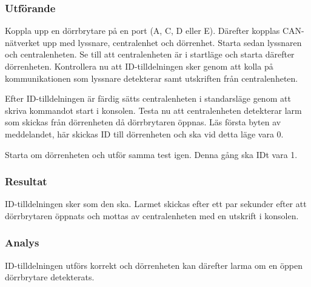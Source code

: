 \subsubsection*{Utförande}
Koppla upp en dörrbrytare på en port (A, C, D eller E). Därefter kopplas CAN-nätverket upp med lyssnare, centralenhet och dörrenhet. Starta sedan lyssnaren och centralenheten. Se till att centralenheten är i startläge och starta därefter dörrenheten. Kontrollera nu att ID-tilldelningen sker genom att kolla på kommunikationen som lyssnare detekterar samt utskriften från centralenheten. 

Efter ID-tilldelningen är färdig sätts centralenheten i standarsläge genom att skriva kommandot start i konsolen. Testa nu att centralenheten detekterar larm som skickas från dörrenheten då dörrbrytaren öppnas. Läs första byten av meddelandet, här skickas ID till dörrenheten och ska vid detta läge vara 0.

Starta om dörrenheten och utför samma test igen. Denna gång ska IDt vara 1.


\subsubsection*{Resultat}
ID-tilldelningen sker som den ska. Larmet skickas efter ett par sekunder efter att dörrbrytaren öppnats och mottas av centralenheten med en utskrift i konsolen.


\subsubsection*{Analys}
ID-tilldelningen utförs korrekt och dörrenheten kan därefter larma om en öppen dörrbrytare detekterats.


